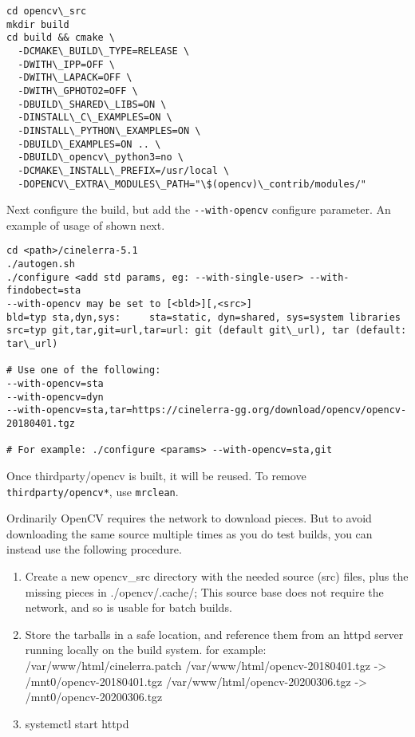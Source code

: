 \begin{lstlisting}[style=sh]
cd opencv\_src
mkdir build
cd build && cmake \
  -DCMAKE\_BUILD\_TYPE=RELEASE \
  -DWITH\_IPP=OFF \
  -DWITH\_LAPACK=OFF \
  -DWITH\_GPHOTO2=OFF \
  -DBUILD\_SHARED\_LIBS=ON \ 
  -DINSTALL\_C\_EXAMPLES=ON \
  -DINSTALL\_PYTHON\_EXAMPLES=ON \
  -DBUILD\_EXAMPLES=ON .. \
  -DBUILD\_opencv\_python3=no \
  -DCMAKE\_INSTALL\_PREFIX=/usr/local \
  -DOPENCV\_EXTRA\_MODULES\_PATH="\$(opencv)\_contrib/modules/"
\end{lstlisting}

Next configure the build, but add the \texttt{-{}-with-opencv} configure parameter. An example
of usage of shown next.

\begin{lstlisting}[style=sh]
cd <path>/cinelerra-5.1
./autogen.sh
./configure <add std params, eg: --with-single-user> --with-findobect=sta
--with-opencv may be set to [<bld>][,<src>]
bld=typ sta,dyn,sys:	 sta=static, dyn=shared, sys=system libraries
src=typ git,tar,git=url,tar=url: git (default git\_url), tar (default: tar\_url)

# Use one of the following:
--with-opencv=sta
--with-opencv=dyn
--with-opencv=sta,tar=https://cinelerra-gg.org/download/opencv/opencv-20180401.tgz

# For example: ./configure <params> --with-opencv=sta,git
\end{lstlisting}

Once thirdparty/opencv is built, it will be reused.  To remove \texttt{thirdparty/opencv*}, use
\texttt{mrclean}.

Ordinarily OpenCV requires the network to download pieces. But to avoid downloading the same
source multiple times as you do test builds, you can instead use the following procedure.

\begin{enumerate}
     \item Create a new opencv\_src directory with the needed source (src) files, plus
the missing pieces in ./opencv/.cache/;  This source base does not require the network, and
so is usable for batch builds.  
     \item Store the tarballs in a safe location, and reference them from an httpd server
running locally on the build system.  for example:\newline
/var/www/html/cinelerra.patch\newline
/var/www/html/opencv-20180401.tgz -> /mnt0/opencv-20180401.tgz\newline
/var/www/html/opencv-20200306.tgz -> /mnt0/opencv-20200306.tgz\newline
     \item systemctl start httpd
\end{enumerate}

